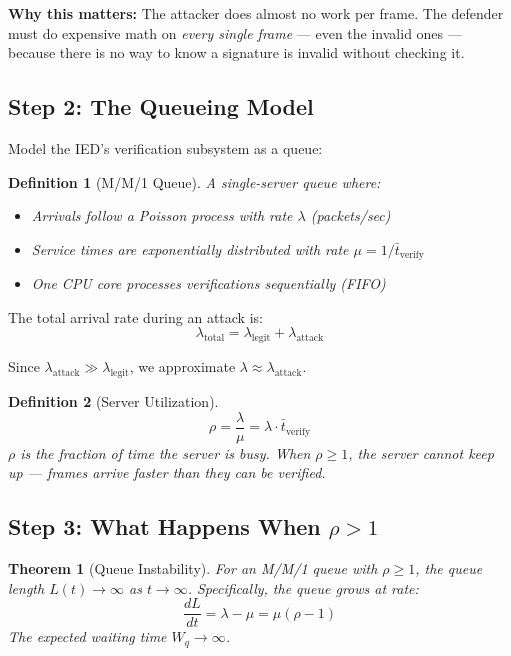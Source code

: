 \documentclass[11pt,a4paper,twocolumn]{article}
\newtheorem{theorem}{Theorem}
\newtheorem{definition}{Definition}
\begin{document}
\textbf{Why this matters:} The attacker does almost no work per frame. The defender must do expensive math on \emph{every single frame} --- even the invalid ones --- because there is no way to know a signature is invalid without checking it.

\subsection{Step 2: The Queueing Model}

Model the IED's verification subsystem as a queue:

\begin{definition}[M/M/1 Queue]
A single-server queue where:
\begin{itemize}[leftmargin=1.5em,itemsep=1pt]
\item Arrivals follow a Poisson process with rate $\lambda$ (packets/sec)
\item Service times are exponentially distributed with rate $\mu = 1/\bar{t}_{\text{verify}}$
\item One CPU core processes verifications sequentially (FIFO)
\end{itemize}
\end{definition}

The total arrival rate during an attack is:
\begin{equation}
\lambda_{\text{total}} = \lambda_{\text{legit}} + \lambda_{\text{attack}}
\end{equation}

Since $\lambda_{\text{attack}} \gg \lambda_{\text{legit}}$, we approximate $\lambda \approx \lambda_{\text{attack}}$.

\begin{definition}[Server Utilization]
\begin{equation}
\boxed{\rho = \frac{\lambda}{\mu} = \lambda \cdot \bar{t}_{\text{verify}}}
\label{eq:rho}
\end{equation}
$\rho$ is the fraction of time the server is busy. When $\rho \geq 1$, the server cannot keep up --- frames arrive faster than they can be verified.
\end{definition}

\subsection{Step 3: What Happens When $\rho > 1$}

\begin{theorem}[Queue Instability]
\label{thm:instability}
For an M/M/1 queue with $\rho \geq 1$, the queue length $L(t) \to \infty$ as $t \to \infty$. Specifically, the queue grows at rate:
\begin{equation}
\frac{dL}{dt} = \lambda - \mu = \mu(\rho - 1)
\end{equation}
The expected waiting time $W_q \to \infty$.
\end{theorem}
\end{document}
